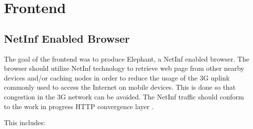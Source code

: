 \section{Frontend}

\subsection{NetInf Enabled Browser}

The goal of the frontend was to produce Elephant, a NetInf enabled browser. The browser should utilize NetInf technology to retrieve web page from other nearby devices and/or caching nodes in order to reduce the usage of the 3G uplink commonly used to access the Internet on mobile devices. This is done so that congestion in the 3G network can be avoided. The NetInf traffic should conform to the work in progress HTTP convergence layer \cite{netinfproto}.

This includes:

